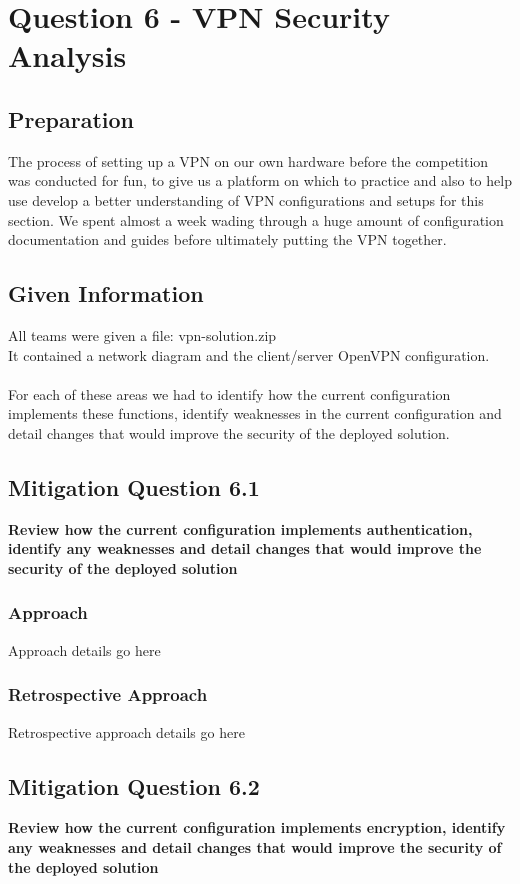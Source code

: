 \chapter{Question 6 - VPN Security Analysis}

\section{Preparation}
The process of setting up a VPN on our own hardware before the competition was
conducted for fun, to give us a platform on which to practice and also to help
use develop a better understanding of VPN configurations and setups for this
section. We spent almost a week wading through a huge amount of configuration
documentation and guides before ultimately putting the VPN together. 

\section{Given Information}
All teams were given a file: vpn-solution.zip\\
It contained a network diagram and the client/server OpenVPN configuration.
\\\\
For each of these areas we had to identify how the current configuration
implements these functions, identify weaknesses in the current configuration and
detail changes that would improve the security of the deployed solution.

\section{Mitigation Question 6.1}
\textbf{Review how the current configuration implements authentication, identify
any weaknesses and detail changes that would improve the security of the
deployed solution}
\subsection{Approach}
Approach details go here
\subsection{Retrospective Approach}
Retrospective approach details go here

\section{Mitigation Question 6.2}
\textbf{Review how the current configuration implements encryption, identify any
weaknesses and detail changes that would improve the security of the deployed
solution}
